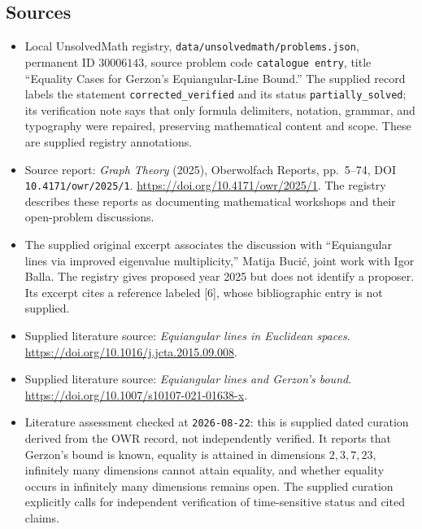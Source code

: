 \documentclass[11pt]{article}
\begin{document}
\subsection{Sources}
\begin{itemize}
\item Local UnsolvedMath registry, \texttt{data/unsolvedmath/problems.json}, permanent ID \(30006143\), source problem code \texttt{catalogue entry}, title ``Equality Cases for Gerzon's Equiangular-Line Bound.'' The supplied record labels the statement \texttt{corrected\_verified} and its status \texttt{partially\_solved}; its verification note says that only formula delimiters, notation, grammar, and typography were repaired, preserving mathematical content and scope. These are supplied registry annotations.
\item Source report: \emph{Graph Theory} (2025), Oberwolfach Reports, pp.\ 5--74, DOI \texttt{10.4171/owr/2025/1}. \url{https://doi.org/10.4171/owr/2025/1}. The registry describes these reports as documenting mathematical workshops and their open-problem discussions.
\item The supplied original excerpt associates the discussion with ``Equiangular lines via improved eigenvalue multiplicity,'' Matija Buci\'{c}, joint work with Igor Balla. The registry gives proposed year 2025 but does not identify a proposer. Its excerpt cites a reference labeled [6], whose bibliographic entry is not supplied.
\item Supplied literature source: \emph{Equiangular lines in Euclidean spaces}. \url{https://doi.org/10.1016/j.jcta.2015.09.008}.
\item Supplied literature source: \emph{Equiangular lines and Gerzon's bound}. \url{https://doi.org/10.1007/s10107-021-01638-x}.
\item Literature assessment checked at \texttt{2026-08-22}: this is supplied dated curation derived from the OWR record, not independently verified. It reports that Gerzon's bound is known, equality is attained in dimensions \(2,3,7,23\), infinitely many dimensions cannot attain equality, and whether equality occurs in infinitely many dimensions remains open. The supplied curation explicitly calls for independent verification of time-sensitive status and cited claims.
\end{itemize}
\end{document}
